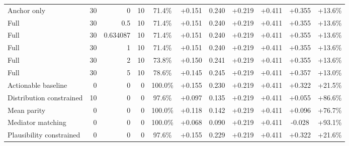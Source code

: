 \begin{table}[htbp]
\begin{tabular}{lrrrccccccc}
Anchor only & 30 & 0 & 10 & 71.4\% & +0.151 & 0.240 & +0.219 & +0.411 & +0.355 & +13.6\% \\
Full & 30 & 0.5 & 10 & 71.4\% & +0.151 & 0.240 & +0.219 & +0.411 & +0.355 & +13.6\% \\
Full & 30 & 0.634087 & 10 & 71.4\% & +0.151 & 0.240 & +0.219 & +0.411 & +0.355 & +13.6\% \\
Full & 30 & 1 & 10 & 71.4\% & +0.151 & 0.240 & +0.219 & +0.411 & +0.355 & +13.6\% \\
Full & 30 & 2 & 10 & 73.8\% & +0.150 & 0.241 & +0.219 & +0.411 & +0.355 & +13.6\% \\
Full & 30 & 5 & 10 & 78.6\% & +0.145 & 0.245 & +0.219 & +0.411 & +0.357 & +13.0\% \\
Actionable baseline & 0 & 0 & 0 & 100.0\% & +0.155 & 0.230 & +0.219 & +0.411 & +0.322 & +21.5\% \\
Distribution constrained & 10 & 0 & 0 & 97.6\% & +0.097 & 0.135 & +0.219 & +0.411 & +0.055 & +86.6\% \\
Mean parity & 0 & 0 & 0 & 100.0\% & +0.118 & 0.142 & +0.219 & +0.411 & +0.096 & +76.7\% \\
Mediator matching & 0 & 0 & 0 & 100.0\% & +0.068 & 0.090 & +0.219 & +0.411 & -0.028 & +93.1\% \\
Plausibility constrained & 0 & 0 & 0 & 97.6\% & +0.155 & 0.229 & +0.219 & +0.411 & +0.322 & +21.6\% \\
\bottomrule
\end{tabular}
\end{table}